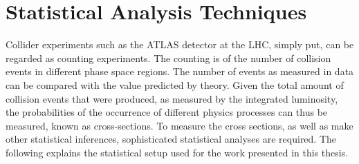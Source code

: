 \chapter{Statistical Analysis Techniques}
\label{chap:statistics}

Collider experiments such as the ATLAS detector at the LHC, simply put, can be regarded as counting experiments. 
The counting is of the number of collision events in different phase space regions. 
The number of events as measured in data can be compared with the value predicted by theory.
Given the total amount of collision events that were produced, as measured by the integrated luminosity, the probabilities of the occurrence of different physics processes can thus be measured, known as cross-sections.
To measure the cross sections, as well as make other statistical inferences, sophisticated statistical analyses are required. The following explains the statistical setup used for the work presented in this thesis.


